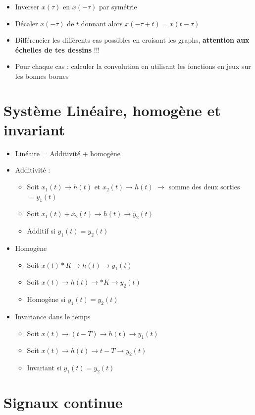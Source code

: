 \documentclass{article}
\theoremstyle{plain}%
\theoremstyle{definition}
\theoremstyle{remark}
\begin{document}
\begin{itemize}
    \item Inverser $ x(\tau ) $ en $ x(-\tau) $ par symétrie
    \item Décaler $ x(-\tau) $ de $ t $ donnant alors $ x(- \tau + t ) = x(t - \tau )$ 
    \item Différencier les différents cas possibles en croisant les graphs, \textbf{attention aux échelles de tes dessins} !!! 
    \item Pour chaque cas : calculer la convolution en utilisant les fonctions en jeux sur les bonnes bornes
\end{itemize}

\section{Système Linéaire, homogène et invariant}
\begin{itemize}
    \item Linéaire = Additivité + homogène 
    \item Additivité : \begin{itemize}
        \item Soit $ x_1(t) \to h(t) $ et $ x_2(t) \to h(t) $ $\rightarrow$ somme des deux sorties $ = y_1(t) $
        \item Soit $ x_1(t)+x_2(t) \to h(t) \to y_2(t) $
        \item Additif si $ y_1(t) = y_2(t) $  
    \end{itemize} 
    \item Homogène \begin{itemize}
        \item Soit $ x(t)*K \to h(t) \to y_1(t)$ 
        \item Soit $ x(t) \to h(t) \to *K \to y_2(t)$
        \item Homogène si $ y_1(t) = y_2(t) $
    \end{itemize}
    \item Invariance dans le temps \begin{itemize}
        \item Soit $ x(t) \to (t-T) \to h(t) \to y_1(t) $ 
        \item Soit $ x(t) \to h(t) \to t-T \to y_2(t) $ 
        \item Invariant si $ y_1(t) = y_2(t) $
    \end{itemize}
\end{itemize}

\section{Signaux continue}
\end{document}
